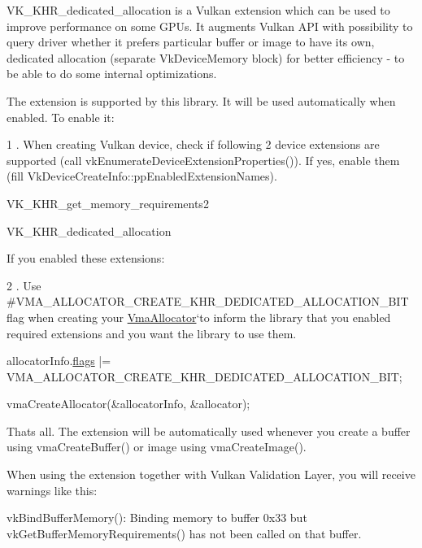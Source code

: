 V\+K\+\_\+\+K\+H\+R\+\_\+dedicated\+\_\+allocation is a Vulkan extension which can be used to improve performance on some G\+P\+Us. It augments Vulkan A\+PI with possibility to query driver whether it prefers particular buffer or image to have its own, dedicated allocation (separate {\ttfamily Vk\+Device\+Memory} block) for better efficiency -\/ to be able to do some internal optimizations.

The extension is supported by this library. It will be used automatically when enabled. To enable it\+:

1 . When creating Vulkan device, check if following 2 device extensions are supported (call {\ttfamily vk\+Enumerate\+Device\+Extension\+Properties()}). If yes, enable them (fill {\ttfamily Vk\+Device\+Create\+Info\+::pp\+Enabled\+Extension\+Names}).


\begin{DoxyItemize}
\item V\+K\+\_\+\+K\+H\+R\+\_\+get\+\_\+memory\+\_\+requirements2
\item V\+K\+\_\+\+K\+H\+R\+\_\+dedicated\+\_\+allocation
\end{DoxyItemize}

If you enabled these extensions\+:

2 . Use \#\+V\+M\+A\+\_\+\+A\+L\+L\+O\+C\+A\+T\+O\+R\+\_\+\+C\+R\+E\+A\+T\+E\+\_\+\+K\+H\+R\+\_\+\+D\+E\+D\+I\+C\+A\+T\+E\+D\+\_\+\+A\+L\+L\+O\+C\+A\+T\+I\+O\+N\+\_\+\+B\+IT flag when creating your \hyperlink{structVmaAllocator}{Vma\+Allocator}`to inform the library that you enabled required extensions and you want the library to use them.


\begin{DoxyCode}
allocatorInfo.\hyperlink{structVmaAllocatorCreateInfo_a392ea2ecbaff93f91a7c49f735ad4346}{flags} |= VMA\_ALLOCATOR\_CREATE\_KHR\_DEDICATED\_ALLOCATION\_BIT;

vmaCreateAllocator(&allocatorInfo, &allocator);
\end{DoxyCode}


That\textquotesingle{}s all. The extension will be automatically used whenever you create a buffer using vma\+Create\+Buffer() or image using vma\+Create\+Image().

When using the extension together with Vulkan Validation Layer, you will receive warnings like this\+: \begin{DoxyVerb}vkBindBufferMemory(): Binding memory to buffer 0x33 but vkGetBufferMemoryRequirements() has not been called on that buffer.
\end{DoxyVerb}


